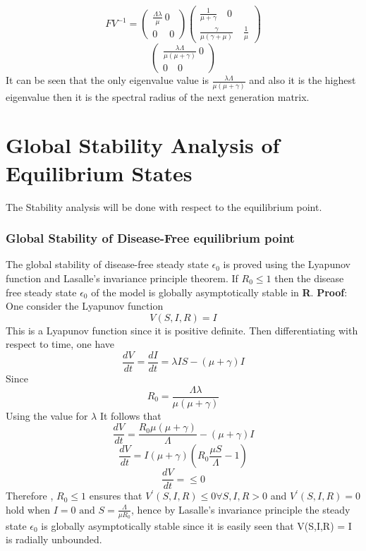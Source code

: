 \documentclass[a4paper,12pt]{report}
\numberwithin{equation}{section}
\begin{document}
\begin{equation*}
FV^{-1} = \left( 
\begin{matrix}
\frac{\Lambda \lambda }{\mu } \ 0 \\
 0 \quad \ 0
\end{matrix} \right) 
\left(
\begin{matrix}
\frac{1}{\mu + \gamma } \quad 0 \\
\frac{\gamma}{\mu (\gamma + \mu )} \quad \frac{1}{\mu}
\end{matrix}\right)
\end{equation*}
\begin{equation*}
\left(
\begin{matrix}
\frac{\lambda \Lambda}{\mu (\mu + \gamma)} \ 0 \\
0 \quad 0
\end{matrix} \right)
\end{equation*}
It can be seen that the only eigenvalue value is $\frac{\lambda \Lambda}{\mu (\mu + \gamma)}$ and also it is the highest eigenvalue then it is the spectral radius of the next generation matrix.
\section{Global Stability Analysis of Equilibrium States}
The Stability analysis will be done with respect to the equilibrium point.
\subsubsection{Global Stability of Disease-Free equilibrium point}
The global stability of disease-free steady state $\epsilon_{0}$ is proved using the Lyapunov function and Lasalle's invariance principle theorem.
\theorem If $R_{0} \leq 1$ then the disease free steady state $\epsilon_{0}$ of the model is globally asymptotically stable in \textbf{R}.
\textbf{Proof}: One consider the Lyapunov function
$$V(S,I,R) = I $$
This is a Lyapunov function since it is positive definite. Then differentiating with respect to time, one have 
$$\frac{dV}{dt} = \frac{dI}{dt} = \lambda IS - (\mu + \gamma)I$$
Since\\
 $$R_{0} = \dfrac{\Lambda \lambda}{\mu (\mu + \gamma)}$$
 Using the value for $\lambda$ It follows that 
 $$\frac{dV}{dt} = \frac{R_{0} \mu (\mu + \gamma)}{\Lambda} - (\mu + \gamma)I$$
 $$\frac{dV}{dt} = I(\mu + \gamma)(R_{0}\frac{\mu S}{\Lambda} - 1)$$
$$\frac{dV}{dt} = \leq 0$$
Therefore , $R_{0}\leq 1 $ ensures that $V^{\prime}(S,I,R) \leq 0 \forall S,I,R > 0 $ and $V^{\prime}(S,I,R) = 0$ hold when $I = 0 \mbox{ and } S = \frac{\Lambda}{\mu R_{0}}$, hence by Lasalle's invariance principle the steady state $\epsilon_{0}$ is globally asymptotically stable since it is easily seen that V(S,I,R) = I is radially unbounded. 
\end{document}
